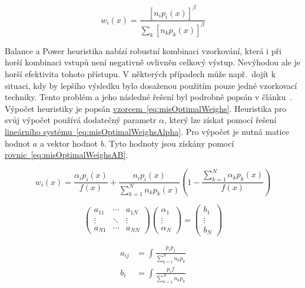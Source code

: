 \documentclass[czech,master]{diploma}
\begin{document}
\begin{equation} \label{eq:balancePowerHeuristic}
  w_i\left( x \right) = \frac{\left[n_{i} p_{i}(x)\right]^\beta}{\sum_{k}\left[n_kp_k(x)\right]^\beta}
\end{equation}

Balance a Power heuristika nabízí robustní kombinaci vzorkování, která i při horší kombinaci vstupů není negativně ovlivněn celkový výstup. Nevýhodou ale je horší efektivita tohoto přístupu. V některých případech může např.\ dojít k situaci, kdy by lepšího výsledku bylo dosaženou použitím pouze jedné vzorkovací techniky. Tento problém a jeho následné řešení byl podrobně popsán v článku~\cite{OptimalMIS}. Výpočet heuristiky je popsán \hyperref[eq:misOptimalWeighs]{vzorcem~\ref{eq:misOptimalWeighs}}. Heuristika pro svůj výpočet používá dodatečný parametr \(\alpha\), který lze získat pomocí řešení \hyperref[eq:misOptimalWeighsAlpha]{lineárního systému~\ref{eq:misOptimalWeighsAlpha}}. Pro výpočet je nutná matice hodnot \(a\) a vektor hodnot \(b\). Tyto hodnoty jsou získány pomocí \hyperref[eq:misOptimalWeighsAB]{rovnic~\ref{eq:misOptimalWeighsAB}}.

\begin{equation} \label{eq:misOptimalWeighs}
  w_i\left( x \right) = \frac{\alpha_i p_i\left( x \right)}{f\left( x \right)} + \frac{n_i p_i(x)}{\sum^{N}_{k=1}n_k p_k(x)}\left(1-\frac{\sum^{N}_{k=1}\alpha_k p_k\left( x \right)}{f(x)}\right)
\end{equation}

\begin{equation} \label{eq:misOptimalWeighsAlpha}
  \begin{pmatrix} a_{11} & \cdots & a_{1N} \\ \vdots & \ddots & \vdots \\ a_{N1} & \cdots & a_{NN} \end{pmatrix} \begin{pmatrix} \alpha_{1} \\ \vdots \\ \alpha_{N} \end{pmatrix} = \begin{pmatrix} b_{1} \\ \vdots \\ b_{N} \end{pmatrix}
\end{equation}

\begin{align} \label{eq:misOptimalWeighsAB}
  a_{ij} & = \int\frac{p_i p_j}{\sum^{N}_{k=1}n_k p_k} \\
  b_{i}  & = \int\frac{p_i f}{\sum^{N}_{k=1}n_k p_k}
\end{align}
\end{document}
